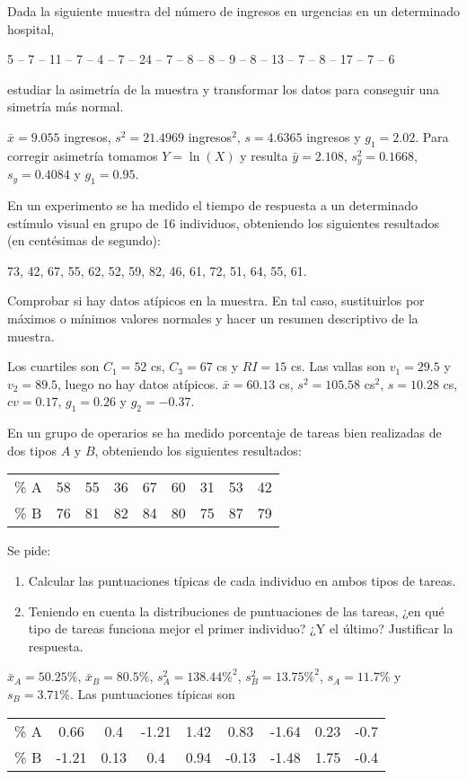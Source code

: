 {Dada la siguiente muestra del número de ingresos en urgencias en un determinado hospital,
\begin{center}
5 -- 7 -- 11 -- 7 -- 4 -- 7 -- 24 -- 7 -- 8 -- 8 -- 9 -- 8 -- 13 -- 7 -- 8 -- 17 -- 7 -- 6
\end{center}
estudiar la asimetría de la muestra y transformar los datos para conseguir una simetría más normal.
}
{$\bar x=9.055$ ingresos, $s^2=21.4969$ ingresos$^2$, $s=4.6365$ ingresos y $g_1=2.02$.
Para corregir asimetría tomamos $Y=\ln(X)$ y resulta $\bar y= 2.108$, $s_y^2=0.1668$, $s_y=0.4084$ y $g_1=0.95$.
}
{}


{En un experimento se ha medido el tiempo de respuesta a un determinado estímulo visual en grupo de 16 individuos, obteniendo los siguientes resultados (en centésimas de segundo):
\begin{center}
73, 42, 67, 55, 62, 52, 59, 82, 46, 61, 72, 51, 64, 55, 61.
\end{center}
Comprobar si hay datos atípicos en la muestra. En tal caso, sustituirlos por máximos o mínimos valores normales y hacer un resumen descriptivo de la muestra.
}
{Los cuartiles son $C_1=52$ cs, $C_3=67$ cs y $RI=15$ cs. Las vallas son $v_1=29.5$ y $v_2=89.5$, luego no hay datos atípicos. $\bar x=60.13$ cs, $s^2=105.58$ cs$^2$, $s=10.28$ cs, $cv=0.17$, $g_1=0.26$ y $g_2=-0.37$.
}
{}


{En un grupo de operarios se ha medido porcentaje de tareas bien realizadas de dos tipos $A$ y $B$, obteniendo los siguientes resultados:
\begin{center}
\begin{tabular}{ccccccccc}
\% A & 58 & 55 & 36 & 67 & 60 & 31 & 53 & 42\\
\% B & 76 & 81 & 82 & 84 & 80 & 75 & 87 & 79\\
\end{tabular}
\end{center}
Se pide:
\begin{enumerate}
\item Calcular las puntuaciones típicas de cada individuo en ambos tipos de tareas.
\item Teniendo en cuenta la distribuciones de puntuaciones de las tareas, ¿en qué tipo de tareas funciona mejor el primer individuo? ¿Y el último? Justificar la respuesta.
\end{enumerate}
}
{$\bar{x}_A=50.25\%$, $\bar{x}_B=80.5\%$, $s_A^2=138.44\%^2$, $s_B^2=13.75\%^2$, $s_A=11.7\%$ y $s_B=3.71\%$. Las puntuaciones típicas son
\begin{center}
\begin{tabular}{ccccccccc}
\% A & 0.66 & 0.4 & -1.21 & 1.42 & 0.83 & -1.64 & 0.23 & -0.7\\
\% B & -1.21 & 0.13 & 0.4 & 0.94 & -0.13 & -1.48 & 1.75 & -0.4\\
\end{tabular}
\end{center}
}
{}


